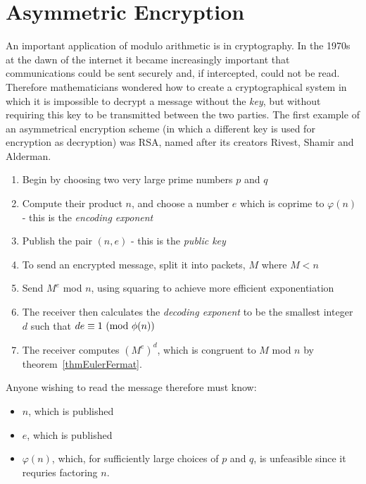 \documentclass[../Main.tex]{subfiles}
\begin{document}
\section{Asymmetric Encryption}
An important application of modulo arithmetic is in cryptography. In the 1970s at the dawn of the internet it became increasingly important that communications could be sent securely and, if intercepted, could not be read. Therefore mathematicians wondered how to create a cryptographical system in which it is impossible to decrypt a message without the \textit{key}, but without requiring this key to be transmitted between the two parties.
The first example of an asymmetrical encryption scheme (in which a different key is used for encryption as decryption) was RSA, named after its creators Rivest, Shamir and Alderman.
\begin{enumerate}
    \item Begin by choosing two very large prime numbers $p$ and $q$
    \item Compute their product $n$, and choose a number $e$ which is coprime to $\varphi(n)$ - this is the \textit{encoding exponent}
    \item Publish the pair $(n, e)$ - this is the \textit{public key}
    \item To send an encrypted message, split it into packets, $M$ where $M < n$
    \item Send $M^e$ mod $n$, using squaring to achieve more efficient exponentiation
    \item The receiver then calculates the \textit{decoding exponent} to be the smallest integer $d$ such that $de \equiv 1~(\text{mod}~{\phi(n)})$
    \item The receiver computes $\left(M^e\right)^d$, which is congruent to $M$ mod $n$ by theorem~\ref{thmEulerFermat}.
\end{enumerate}
Anyone wishing to read the message therefore must know:
\begin{itemize}
    \item $n$, which is published
    \item $e$, which is published
    \item $\varphi(n)$, which, for sufficiently large choices of $p$ and $q$, is unfeasible since it requries factoring $n$.
\end{itemize}
\end{document}
